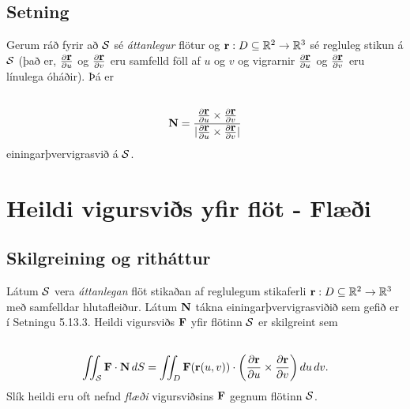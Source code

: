 \documentclass[a4paper,10pt,icelandic]{sphinxmanual}
\begin{document}
\subsection{Setning}
\label{Kafli5:id25}
Gerum ráð fyrir að \(\cal S\) sé \textit{áttanlegur} flötur og
\(\mbox{${\bf r}$}:D\subseteq{\mathbb  R}^2\rightarrow {\mathbb  R}^3\)
sé regluleg stikun á \(\cal S\) (það er,
\(\frac{\partial \mbox{${\bf r}$}}{\partial u}\) og
\(\frac{\partial \mbox{${\bf r}$}}{\partial v}\) eru samfelld föll
af \(u\) og \(v\) og vigrarnir
\(\frac{\partial \mbox{${\bf r}$}}{\partial u}\) og
\(\frac{\partial \mbox{${\bf r}$}}{\partial v}\) eru línulega
óháðir). Þá er
\begin{gather}
\begin{split}\displaystyle\end{split}\notag\\\begin{split}\mbox{${\bf N}$}=
\frac{\frac{\partial \mbox{${\bf r}$}}{\partial u}\times\frac{\partial
    \mbox{${\bf r}$}}{\partial v}}
{|\frac{\partial \mbox{${\bf r}$}}{\partial u}\times\frac{\partial
    \mbox{${\bf r}$}}{\partial v}|}\end{split}\notag
\end{gather}
einingarþvervigrasvið á \(\cal S\).


\section{Heildi vigursviðs yfir flöt - Flæði}
\label{Kafli5:heildi-vigursvis-yfir-flot-flaei}\label{Kafli5:index-10}

\subsection{Skilgreining og ritháttur}
\label{Kafli5:skilgreining-og-rithattur}
Látum \(\cal S\) vera \textit{áttanlegan} flöt stikaðan af reglulegum
stikaferli
\(\mbox{${\bf r}$}:D\subseteq{\mathbb  R}^2\rightarrow {\mathbb  R}^3\)
með samfelldar hlutafleiður. Látum \(\mbox{${\bf N}$}\) tákna
einingarþvervigrasviðið sem gefið er í Setningu 5.13.3. Heildi vigursviðs
\(\mbox{${\bf F}$}\) yfir flötinn \(\cal S\) er skilgreint sem
\begin{gather}
\begin{split}\displaystyle\end{split}\notag\\\begin{split}\int\!\!\!\int_{\cal S} \mbox{${\bf F}$}\cdot\mbox{${\bf N}$}\,dS
=\int\!\!\!\int_D \mbox{${\bf F}$}(\mbox{${\bf r}$}(u,v))\cdot \bigg(
\frac{\partial \mbox{${\bf r}$}}{\partial u}\times\frac{\partial \mbox{${\bf r}$}}{\partial
  v}\bigg)\,
du\,dv.\end{split}\notag
\end{gather}
Slík heildi eru oft nefnd \textit{flæði} vigursviðsins \(\mbox{${\bf F}$}\)
gegnum flötinn \(\cal S\).
\end{document}
